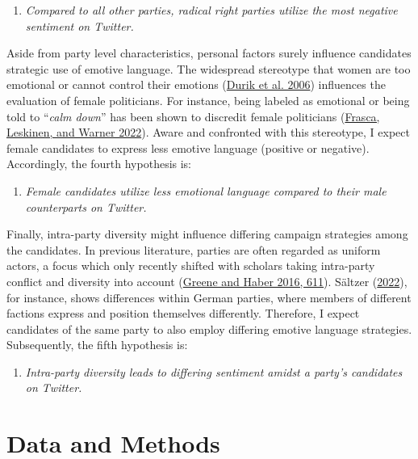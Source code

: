 \documentclass[a4paper,11pt]{article}
\begin{document}
\begin{center}
  \begin{enumerate}[label=\textit{H3}]
    \item \textit{Compared to all other parties, radical right parties utilize the most negative sentiment on Twitter.}\label{hypothesis:H3}
  \end{enumerate}
\end{center}
Aside from party level characteristics, personal factors surely influence candidates strategic use of emotive language. The widespread stereotype that women are too emotional or cannot control their emotions (\protect\hyperlink{ref-durikEthnicityGenderStereotypes2006}{Durik et al. 2006}) influences the evaluation of female politicians. For instance, being labeled as emotional or being told to ``\emph{calm down}'' has been shown to discredit female politicians (\protect\hyperlink{ref-frascaWordsWeaponsLabeling2022}{Frasca, Leskinen, and Warner 2022}). Aware and confronted with this stereotype, I expect female candidates to express less emotive language (positive or negative). Accordingly, the fourth hypothesis is:
\begin{center}
  \begin{enumerate}[label=\textit{H4}]
    \item \textit{Female candidates utilize less emotional language compared to their male counterparts on Twitter.}\label{hypothesis:H4}
  \end{enumerate}
\end{center}
Finally, intra-party diversity might influence differing campaign strategies among the candidates. In previous literature, parties are often regarded as uniform actors, a focus which only recently shifted with scholars taking intra-party conflict and diversity into account (\protect\hyperlink{ref-greeneLeadershipCompetitionDisagreement2016}{Greene and Haber 2016, 611}). Sältzer (\protect\hyperlink{ref-saltzerFindingBirdWings2022}{2022}), for instance, shows differences within German parties, where members of different factions express and position themselves differently.
\newpage
Therefore, I expect candidates of the same party to also employ differing emotive language strategies. Subsequently, the fifth hypothesis is:
\begin{center}
  \begin{enumerate}[label=\textit{H5}]
    \item \textit{Intra-party diversity leads to differing sentiment amidst a party's candidates on Twitter.}
  \end{enumerate}\label{hypothesis:H5}
\end{center}
\hypertarget{data}{%
\section{Data and Methods}\label{data}}
\end{document}
